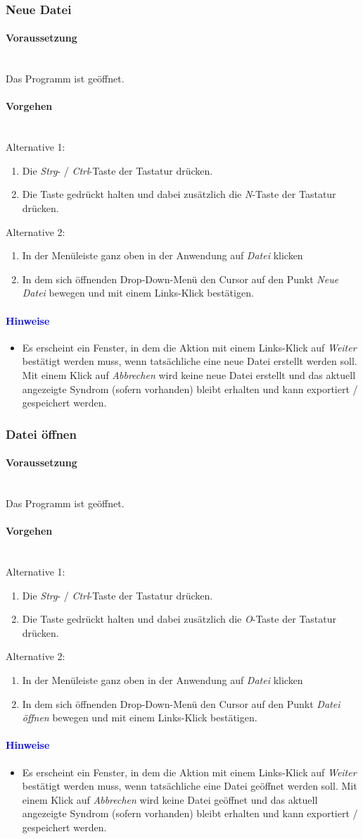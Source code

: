 \documentclass[enabledeprecatedfontcommands,fontsize=11pt,paper=a4,twoside]{scrartcl}
\newcommand*{\hint}{\paragraph{\textcolor{blue}{Hinweise}}}
\newcommand*{\condition}{\paragraph{Voraussetzung}$\;$ \vspace{0.2cm}\\}
\newcommand*{\actions}{\paragraph{Vorgehen} $\;$\vspace{0.2cm}\\}
\begin{document}
		\subsubsection{Neue Datei}
		\condition 	
		Das Programm ist geöffnet.
		\actions
		Alternative 1:
		\begin{enumerate}
				\item Die \textit{Strg}- / \textit{Ctrl}-Taste der Tastatur drücken.
				\item Die Taste gedrückt halten und dabei zusätzlich die \textit{N}-Taste der Tastatur drücken.
		\end{enumerate}				
		Alternative 2:
		\begin{enumerate}
				\item In der Menüleiste ganz oben in der Anwendung auf \textit{Datei} klicken 
				\item In dem sich öffnenden Drop-Down-Menü den Cursor auf den Punkt \textit{Neue Datei} bewegen und mit einem Links-Klick bestätigen.
		\end{enumerate}		
		\hint
		\begin{itemize}
				\item Es erscheint ein Fenster, in dem die Aktion mit einem Links-Klick auf \textit{Weiter} bestätigt werden muss, wenn tatsächliche eine neue Datei erstellt werden soll. Mit einem Klick auf \textit{Abbrechen} wird keine neue Datei erstellt und das aktuell angezeigte Syndrom (sofern vorhanden) bleibt erhalten und kann exportiert / gespeichert werden.
		\end{itemize}
		
							\newpage
		\subsubsection{Datei öffnen}
		\condition 	
		Das Programm ist geöffnet.
		\actions
		Alternative 1:
		\begin{enumerate}
				\item Die \textit{Strg}- / \textit{Ctrl}-Taste der Tastatur drücken.
				\item Die Taste gedrückt halten und dabei zusätzlich die \textit{O}-Taste der Tastatur drücken.
		\end{enumerate}				
		Alternative 2:
		\begin{enumerate}
				\item In der Menüleiste ganz oben in der Anwendung auf \textit{Datei} klicken 
				\item In dem sich öffnenden Drop-Down-Menü den Cursor auf den Punkt \textit{Datei öffnen} bewegen und mit einem Links-Klick bestätigen.
		\end{enumerate}		
		\hint
		\begin{itemize}
				\item Es erscheint ein Fenster, in dem die Aktion mit einem Links-Klick auf \textit{Weiter} bestätigt werden muss, wenn tatsächliche eine Datei geöffnet werden soll. Mit einem Klick auf \textit{Abbrechen} wird keine Datei geöffnet und das aktuell angezeigte Syndrom (sofern vorhanden) bleibt erhalten und kann exportiert / gespeichert werden.
		\end{itemize}
\end{document}

